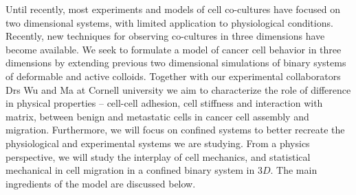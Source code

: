 \documentclass[aps,prb,twocolumn,groupedaddress,nofootinbib,floatfix]{revtex4}
\begin{document}
Until recently, most experiments and models of cell co-cultures have focused on two dimensional systems, with limited application to physiological conditions\cite{Jong}.
Recently, new techniques for observing co-cultures in three dimensions have become available\citep{Alessandri}.
We seek to formulate a model of cancer cell behavior in three dimensions by extending previous two dimensional simulations of binary systems of deformable and active colloids\cite{Butcher}.
Together with our experimental collaborators Drs Wu and Ma at Cornell university we aim to characterize the role of difference in physical properties -- 
cell-cell adhesion, cell stiffness and interaction with matrix, between benign and metastatic cells in cancer cell assembly and migration.
Furthermore, we will focus on confined systems to better recreate the physiological and experimental systems we are studying.
From a physics perspective, we will study the interplay of cell mechanics, and statistical mechanical in cell migration in a confined binary system in $3D$.
The main ingredients of the model are discussed below.
\end{document}
